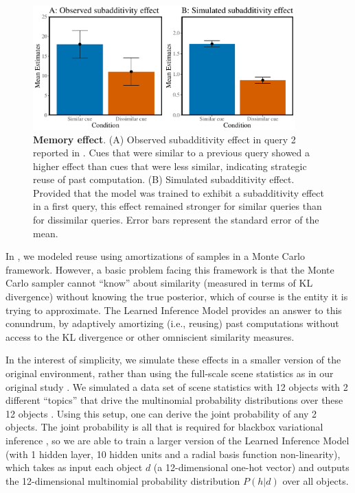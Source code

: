 \begin{figure}
\centering
\includegraphics[width=0.9\textwidth]{figures/amonew.pdf} 
  \caption{\textbf{Memory effect}. (A) Observed subadditivity effect in query 2 reported in \cite{dasgupta2018remembrance}. Cues that were similar to a previous query showed a higher effect than cues that were less similar, indicating strategic reuse of past computation. (B) Simulated subadditivity effect. Provided that the model was trained to exhibit a subadditivity effect in a first query, this effect remained stronger for similar queries than for dissimilar queries. Error bars represent the standard error of the mean.
  } 
  \label{fig:amo}
\end{figure}

In \citet{dasgupta2018remembrance}, we modeled reuse using amortizations of samples in a Monte Carlo framework. However, a basic problem facing this framework is that the Monte Carlo sampler cannot ``know'' about similarity (measured in terms of KL divergence) without knowing the true posterior, which of course is the entity it is trying to approximate. The Learned Inference Model provides an answer to this conundrum, by adaptively amortizing (i.e., reusing) past computations without access to the KL divergence or other omniscient similarity measures.

In the interest of simplicity, we simulate these effects in a smaller version of the original environment, rather than using the full-scale scene statistics as in our original study \citep{dasgupta2018remembrance}. We simulated a data set of scene statistics with 12 objects with 2 different ``topics'' that drive the multinomial probability distributions over these 12 objects \citep{blei2003latent}. Using this setup, one can derive the joint probability of any 2 objects. The joint probability is all that is required for blackbox variational inference \citep{ranganath2014black}, so we are able to train a larger version of the Learned Inference Model (with 1 hidden layer, 10 hidden units and a radial basis function non-linearity), which takes as input each object $d$ (a 12-dimensional one-hot vector) and outputs the 12-dimensional multinomial probability distribution $P(h|d)$ over all objects.

